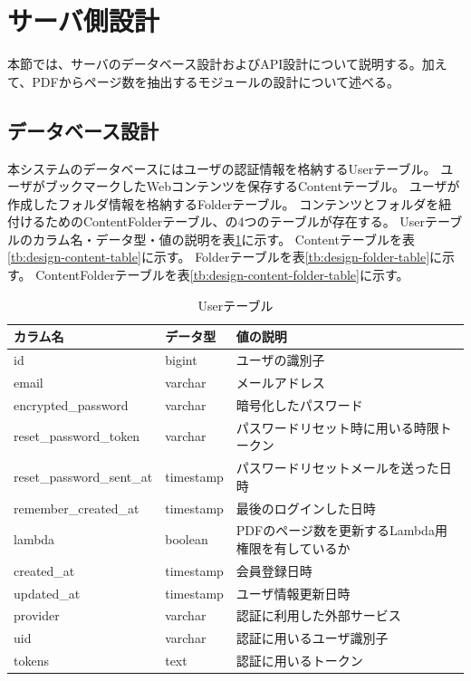 \section{サーバ側設計}
本節では、サーバのデータベース設計およびAPI設計について説明する。加えて、PDFからページ数を抽出するモジュールの設計について述べる。

\subsection{データベース設計}
本システムのデータベースにはユーザの認証情報を格納するUserテーブル。
ユーザがブックマークしたWebコンテンツを保存するContentテーブル。
ユーザが作成したフォルダ情報を格納するFolderテーブル。
コンテンツとフォルダを紐付けるためのContentFolderテーブル、の4つのテーブルが存在する。
Userテーブルのカラム名・データ型・値の説明を表\ref{tb:design-user-table}に示す。
Contentテーブルを表\ref{tb:design-content-table}に示す。
Folderテーブルを表\ref{tb:design-folder-table}に示す。
ContentFolderテーブルを表\ref{tb:design-content-folder-table}に示す。

\begin{table}[htbp]
  \label{tb:design-user-table}
  \caption{Userテーブル}
  \begin{center}
    \begin{tabular}{|l|l|l|}
      \hline
      カラム名 & データ型 & 値の説明 \\\hline\hline
      id & bigint & ユーザの識別子 \\\hline
      email & varchar & メールアドレス \\\hline
      encrypted\_password & varchar & 暗号化したパスワード \\\hline
      reset\_password\_token & varchar & パスワードリセット時に用いる時限トークン \\\hline
      reset\_password\_sent\_at & timestamp & パスワードリセットメールを送った日時 \\\hline
      remember\_created\_at & timestamp & 最後のログインした日時 \\\hline
      lambda & boolean & PDFのページ数を更新するLambda用権限を有しているか \\\hline
      created\_at & timestamp & 会員登録日時 \\\hline
      updated\_at & timestamp & ユーザ情報更新日時 \\\hline
      provider & varchar & 認証に利用した外部サービス \\\hline
      uid & varchar & 認証に用いるユーザ識別子 \\\hline
      tokens & text & 認証に用いるトークン \\\hline
    \end{tabular}
  \end{center}
\end{table}

